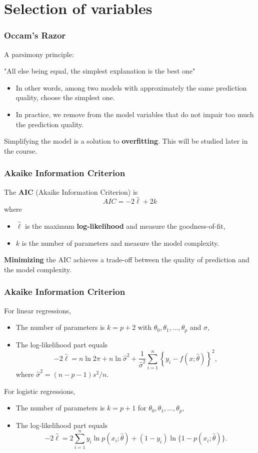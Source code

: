 \section{Selection of variables}
\begin{frame}
\frametitle{Occam's Razor}
A parsimony principle:
\begin{center}
"All else being equal, the simplest explanation is the best one"
\end{center}
\begin{itemize}
\item In other words, among two models with approximately the same prediction quality, choose the simplest one. 
\item In practice, we remove from the model variables that do not impair too much the prediction quality. 
\end{itemize}
Simplifying the model is a solution to {\bf overfitting}. This will be studied later in the course.
\end{frame}
\begin{frame}
\frametitle{Akaike Information Criterion}
The {\bf AIC} (Akaike Information Criterion) is 
$$
AIC = -2\hat{\ell} + 2k
$$
where 
\begin{itemize}
\item $\hat{\ell}$ is the maximum {\bf log-likelihood} and measure the goodness-of-fit, 
\item $k$ is the number of parameters and measure the model complexity.
\end{itemize}
{\bf Minimizing} the AIC achieves a trade-off between the quality of prediction and the model complexity.
\end{frame}
\begin{frame}
\frametitle{Akaike Information Criterion}
For linear regressions,
\begin{itemize}
\item The number of parameters is $k=p+2$ with $\theta_0,\theta_1,\ldots,\theta_p$ and $\sigma$,
\item The log-likelihood part equals
$$
-2\hat{\ell} = n\ln 2\pi + n \ln \hat{\sigma}^2 + \frac{1}{\hat{\sigma}^2}\sum_{i=1}^n \left\{y_i - f(x;\hat{\theta})\right\}^2,
$$
where $\hat{\sigma}^2 = (n-p-1)s^2/n$.
\end{itemize}
For logistic regressions,
\begin{itemize}
\item The number of parameters is $k=p+1$ for $\theta_0,\theta_1,\ldots,\theta_p$, 
\item The log-likelihood part equals
$$
-2\hat{\ell} = 2 \sum_{i=1}^n y_i \ln p(x_i;\hat{\theta}) + (1-y_i) \ln \{1-p(x_i;\hat{\theta})\}.
$$
\end{itemize}
\end{frame}
